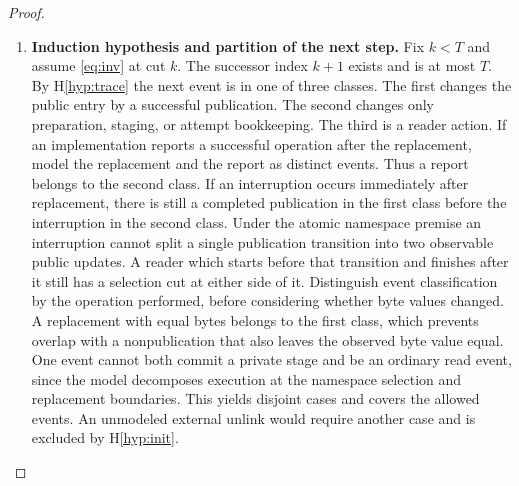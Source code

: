\documentclass[12pt]{article}
\begin{document}
\begin{proof}
\begin{enumerate}
\item \textbf{Induction hypothesis and partition of the next step.}
Fix $k<T$ and assume \eqref{eq:inv} at cut $k$.
The successor index $k+1$ exists and is at most $T$.
By H\ref{hyp:trace} the next event is in one of three classes.
The first changes the public entry by a successful publication.
The second changes only preparation, staging, or attempt bookkeeping.
The third is a reader action.
If an implementation reports a successful operation after the
replacement, model the replacement and the report as distinct
events. Thus a report belongs to the second class.
If an interruption occurs immediately after replacement,
there is still a completed publication in the first class before
the interruption in the second class.
Under the atomic namespace premise an interruption cannot split a
single publication transition into two observable public updates.
A reader which starts before that transition and finishes after
it still has a selection cut at either side of it.
Distinguish event classification by the operation performed,
before considering whether byte values changed.
A replacement with equal bytes belongs to the first class,
which prevents overlap with a nonpublication that also leaves
the observed byte value equal.
One event cannot both commit a private stage and be an ordinary
read event, since the model decomposes execution at the
namespace selection and replacement boundaries.
This yields disjoint cases and covers the allowed events.
An unmodeled external unlink would require another case and
is excluded by H\ref{hyp:init}.


\end{enumerate}
\end{proof}
\end{document}
